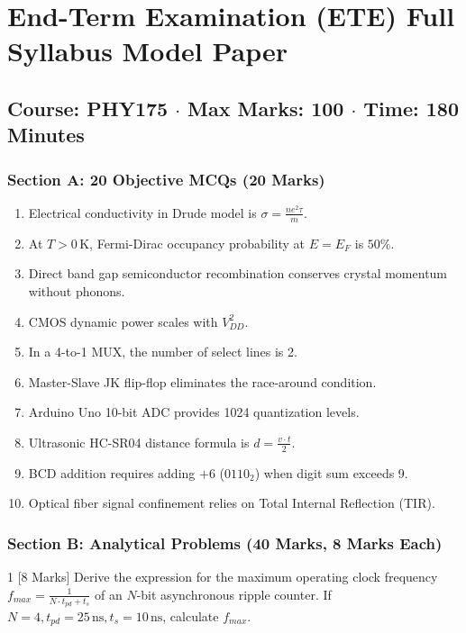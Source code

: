 \chapter{End-Term Examination (ETE) Full Syllabus Model Paper}
\section*{Course: PHY175 $\cdot$ Max Marks: 100 $\cdot$ Time: 180 Minutes}

\subsection*{Section A: 20 Objective MCQs (20 Marks)}
\begin{enumerate}[leftmargin=*]
    \item Electrical conductivity in Drude model is $\sigma = \frac{ne^2\tau}{m}$.
    \item At $T > 0\,\text{K}$, Fermi-Dirac occupancy probability at $E = E_F$ is $50\%$.
    \item Direct band gap semiconductor recombination conserves crystal momentum without phonons.
    \item CMOS dynamic power scales with $V_{DD}^2$.
    \item In a 4-to-1 MUX, the number of select lines is 2.
    \item Master-Slave JK flip-flop eliminates the race-around condition.
    \item Arduino Uno 10-bit ADC provides 1024 quantization levels.
    \item Ultrasonic HC-SR04 distance formula is $d = \frac{v \cdot t}{2}$.
    \item BCD addition requires adding $+6$ ($0110_2$) when digit sum exceeds 9.
    \item Optical fiber signal confinement relies on Total Internal Reflection (TIR).
\end{enumerate}

\subsection*{Section B: Analytical Problems (40 Marks, 8 Marks Each)}

\begin{examqbox}{1 [8 Marks]}
Derive the expression for the maximum operating clock frequency $f_{max} = \frac{1}{N \cdot t_{pd} + t_s}$ of an $N$-bit asynchronous ripple counter. If $N=4, t_{pd}=25\,\text{ns}, t_s=10\,\text{ns}$, calculate $f_{max}$.
\end{examqbox}

